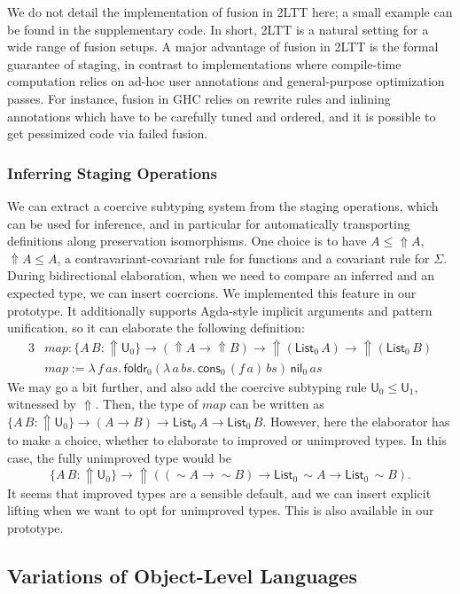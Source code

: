 \documentclass[acmsmall,screen]{acmart}
\newcommand{\mit}[1]{\mathit{#1}}
\newcommand{\msf}[1]{\mathsf{#1}}
\newcommand{\Lift}{{\Uparrow}}
\newcommand{\spl}{{\sim}}
\newcommand{\U}{\msf{U}}
\newcommand{\List}{\msf{List}}
\newcommand{\nil}{\msf{nil}}
\newcommand{\cons}{\msf{cons}}
\theoremstyle{remark}
\begin{document}
We do not detail the implementation of fusion in 2LTT here; a small example can
be found in the supplementary code. In short, 2LTT is a natural setting for a
wide range of fusion setups. A major advantage of fusion in 2LTT is the formal
guarantee of staging, in contrast to implementations where compile-time
computation relies on ad-hoc user annotations and general-purpose optimization
passes. For instance, fusion in GHC relies on rewrite rules and inlining
annotations which have to be carefully tuned and ordered, and it is possible to
get pessimized code via failed fusion.

\subsubsection{Inferring Staging Operations}
We can extract a coercive subtyping system from the staging operations, which
can be used for inference, and in particular for automatically transporting
definitions along preservation isomorphisms. One choice is to have $A \leq \Lift
A$, $\Lift A \leq A$, a contravariant-covariant rule for functions and a
covariant rule for $\Sigma$. During bidirectional elaboration, when we need to
compare an inferred and an expected type, we can insert coercions.  We
implemented this feature in our prototype. It additionally supports Agda-style
implicit arguments and pattern unification, so it can elaborate the following
definition:
\begin{alignat*}{3}
  & \mit{map} : \{A\,B : \Lift\U_0\} \to (\Lift A \to \Lift B)
      \to \Lift(\List_0\,A) \to \Lift(\List_0\,B)\\
  & \mit{map} := \lambda\,f\,\mit{as}.\,
      \msf{foldr}_0
        (\lambda\,a\,\mit{bs}.\, \cons_0\,(f\,a)\,\mit{bs})\,
        \nil_0\,
        as
\end{alignat*}
We may go a bit further, and also add the coercive subtyping rule $\U_0 \leq
\U_1$, witnessed by $\Lift$. Then, the type of $\mit{map}$ can be written as
$\{A\,B : \Lift\U_0\} \to (A \to B) \to \List_0\,A \to \List_0\,B$. However,
here the elaborator has to make a choice, whether to elaborate to improved or
unimproved types. In this case, the fully unimproved type would be
\[ \{A\,B : \Lift\U_0\} \to \Lift((\spl A \to \spl B) \to \List_0\,\spl A \to \List_0\,\spl B). \]
It seems that improved types are a sensible default, and we can insert explicit
lifting when we want to opt for unimproved types. This is also available in our
prototype.

\subsection{Variations of Object-Level Languages}
\label{sec:variations}
\end{document}
